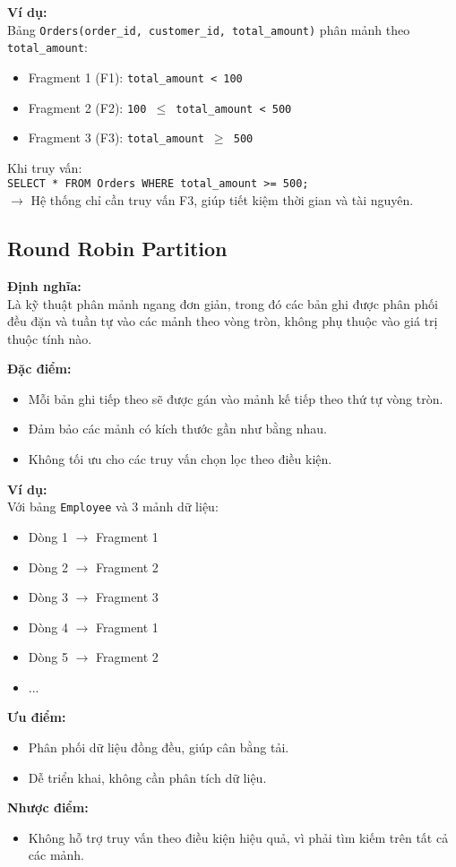 \documentclass[14pt]{extarticle}
\begin{document}
\textbf{Ví dụ:}\\
Bảng \texttt{Orders(order\_id, customer\_id, total\_amount)} phân mảnh theo \texttt{total\_amount}:
\begin{itemize}
    \item Fragment 1 (F1): \texttt{total\_amount < 100}
    \item Fragment 2 (F2): \texttt{100 $\leq$ total\_amount < 500}
    \item Fragment 3 (F3): \texttt{total\_amount $\geq$ 500}
\end{itemize}
Khi truy vấn:\\
\texttt{SELECT * FROM Orders WHERE total\_amount >= 500;}\\
$\rightarrow$ Hệ thống chỉ cần truy vấn F3, giúp tiết kiệm thời gian và tài nguyên.

\subsection{Round Robin Partition}
\textbf{Định nghĩa:}\\
Là kỹ thuật phân mảnh ngang đơn giản, trong đó các bản ghi được phân phối đều đặn và tuần tự vào các mảnh theo vòng tròn, không phụ thuộc vào giá trị thuộc tính nào.

\textbf{Đặc điểm:}
\begin{itemize}
    \item Mỗi bản ghi tiếp theo sẽ được gán vào mảnh kế tiếp theo thứ tự vòng tròn.
    \item Đảm bảo các mảnh có kích thước gần như bằng nhau.
    \item Không tối ưu cho các truy vấn chọn lọc theo điều kiện.
\end{itemize}

\textbf{Ví dụ:}\\
Với bảng \texttt{Employee} và 3 mảnh dữ liệu:
\begin{itemize}
    \item Dòng 1 $\rightarrow$ Fragment 1
    \item Dòng 2 $\rightarrow$ Fragment 2
    \item Dòng 3 $\rightarrow$ Fragment 3
    \item Dòng 4 $\rightarrow$ Fragment 1
    \item Dòng 5 $\rightarrow$ Fragment 2
    \item ...
\end{itemize}

\textbf{Ưu điểm:}
\begin{itemize}
    \item Phân phối dữ liệu đồng đều, giúp cân bằng tải.
    \item Dễ triển khai, không cần phân tích dữ liệu.
\end{itemize}
\textbf{Nhược điểm:}
\begin{itemize}
    \item Không hỗ trợ truy vấn theo điều kiện hiệu quả, vì phải tìm kiếm trên tất cả các mảnh.
\end{itemize}
\end{document}
